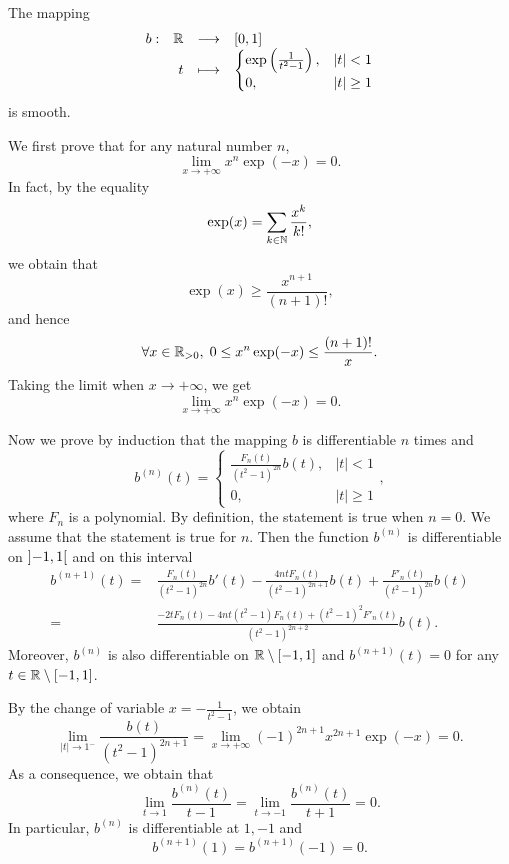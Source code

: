 \begin{lemmaenv}
    The mapping
    $$\begin{array}{rrcl}
        b : & \mathbb{R} & \longrightarrow & [0,1]\\
        & t & \longmapsto & \begin{cases}
            \exp\left(\frac{1}{t^2 - 1}\right), & |t| < 1\\
            0, & |t|\ge 1
        \end{cases}
    \end{array}$$
    is smooth.
\end{lemmaenv}
\begin{proofenv}
    We first prove that for any natural number $n$,
    $$\lim_{x \to +\infty} x^n \exp(-x) = 0.$$
    In fact, by the equality
    $$\exp(x) = \sum_{k \in \mathbb{N}} \frac{x^k}{k!},$$
    we obtain that
    $$\exp(x) \ge \frac{x^{n+1}}{(n+1)!},$$
    and hence
    $$\forall x \in \mathbb{R}_{>0},\; 0 \le x^n \exp(-x) \le \frac{(n+1)!}{x}.$$
    Taking the limit when $x \rightarrow +\infty$, we get
    $$\lim_{x \to +\infty} x^n \exp(-x) = 0.$$
    
    \quad Now we prove by induction that the mapping $b$ is differentiable $n$ times and 
    $$b^{(n)}(t) = \begin{cases}
        \frac{F_n(t)}{(t^2 - 1)^{2n}} b(t), & |t| < 1\\
        0, & |t|\ge 1
    \end{cases},$$
    where $F_n$ is a polynomial.
    By definition, the statement is true when $n = 0$.
    We assume that the statement is true for $n$.
    Then the function $b^{(n)}$ is differentiable on $\interval[open]{-1}{1}$ and on this interval
    $$\begin{aligned}
        b^{(n+1)}(t) = & \frac{F_{n}(t)}{(t^2 - 1)^{2n}}b'(t) - \frac{4ntF_n(t)}{(t^2 - 1)^{2n+1}}b(t) + \frac{F'_n(t)}{(t^2 - 1)^{2n}} b(t)\\
        = & \frac{-2t F_n(t) - 4nt (t^2 - 1) F_n(t) +(t^2 - 1)^2 F'_n(t)}{(t^2 - 1)^{2n+2}} b(t).
    \end{aligned}$$
    Moreover, $b^{(n)}$ is also differentiable on $\RR\setminus\interval{-1}{1}$ and $b^{(n+1)}(t) = 0$ for any $t \in \mathbb{R}\setminus[-1,1]$.

    \quad By the change of variable $x = - \frac{1}{t^2 - 1}$, we obtain
    $$\lim_{|t| \to 1^-} \frac{b(t)}{(t^2 - 1)^{2n + 1}} = \lim_{x \rightarrow +\infty} (-1)^{2n+1} x^{2n + 1} \exp(-x) = 0.$$
    As a consequence, we obtain that
    $$\lim_{t \rightarrow 1} \frac{b^{(n)}(t)}{t - 1} = \lim_{t \rightarrow -1} \frac{b^{(n)}(t)}{t + 1} = 0.$$
    In particular, $b^{(n)}$ is differentiable at $1,-1$ and 
    $$b^{(n+1)}(1) = b^{(n+1)}(-1) = 0.$$
\end{proofenv}

